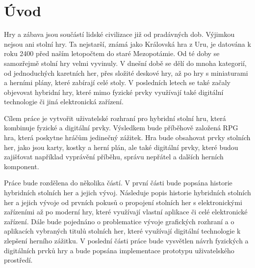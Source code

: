 \chapter{Úvod}
Hry a zábava jsou součástí lidské civilizace již od pradávných dob. Výjimkou nejsou ani stolní hry. Ta nejstarší, známá jako Královská hra z Uru\cite{royal_game_of_ur}, je datována k roku 2400 před naším letopočtem do staré Mezopotámie. Od té doby se samozřejmě stolní hry velmi vyvinuly. V dnešní době se dělí do mnoha kategorií, od jednoduchých karetních her, přes složité deskové hry, až po hry s miniaturami a herními plány, které zabírají celé stoly. V posledních letech se také začaly objevovat hybridní hry, které mimo fyzické prvky využívají také digitální technologie či jiná elektronická zařízení.

Cílem práce je vytvořit uživatelské rozhraní pro hybridní stolní hru, která kombinuje fyzické a digitální prvky. Výsledkem bude příběhově založená RPG hra, která poskytne hráčům jedinečný zážitek. Hra bude obsahovat prvky stolních her, jako jsou karty, kostky a herní plán, ale také digitální prvky, které budou zajišťovat například vyprávění příběhu, správu nepřátel a dalších herních komponent.

Práce bude rozdělena do několika částí. V první části bude popsána historie hybridních stolních her a jejich vývoj. Následuje popis historie hybridních stolních her a jejich vývoje od prvních pokusů o propojení stolních her s elektronickými zařízeními až po moderní hry, které využívají vlastní aplikace či celé elektronické zařízení. Dále bude pojednáno o problematice vývoje grafických rozhraní a o aplikacích vybraných titulů stolních her, které využívají digitální technologie k zlepšení herního zážitku. V poslední části práce bude vysvětlen návrh fyzických a digitálních prvků hry a bude popsána implementace prototypu uživatelského prostředí.